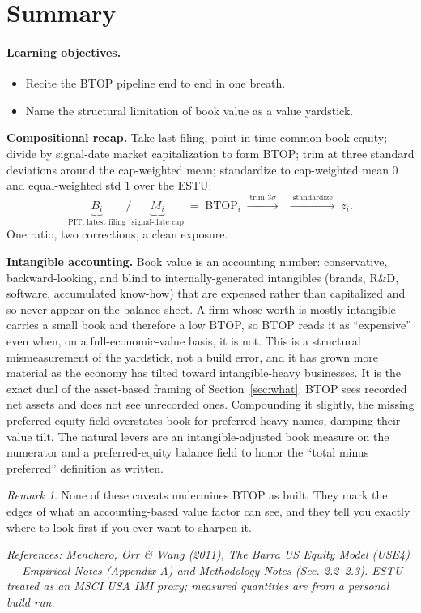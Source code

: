 \documentclass[11pt]{article}
\theoremstyle{definition}
\theoremstyle{plain}
\theoremstyle{remark}
\newtheorem*{remark}{Remark}
\begin{document}
\section{Summary}\label{sec:summary}

\paragraph{Learning objectives.}
\begin{itemize}[leftmargin=1.4em,nosep]
  \item Recite the BTOP pipeline end to end in one breath.
  \item Name the structural limitation of book value as a value yardstick.
\end{itemize}

\textbf{Compositional recap.} Take last-filing, point-in-time common book equity; divide by signal-date market capitalization to form BTOP; trim at three standard deviations around the cap-weighted mean; standardize to cap-weighted mean $0$ and equal-weighted std $1$ over the ESTU:
\[
  \underbrace{B_i}_{\text{PIT, latest filing}} \Big/ \underbrace{M_i}_{\text{signal-date cap}}
  \;=\; \mathrm{BTOP}_i
  \;\xrightarrow{\;\text{trim }3\sigma\;}\;
  \;\xrightarrow{\;\text{standardize}\;}\; z_i.
\]
One ratio, two corrections, a clean exposure.

\begin{pitfall}
\textbf{Intangible accounting.} Book value is an accounting number: conservative, backward-looking, and blind to internally-generated intangibles (brands, R\&D, software, accumulated know-how) that are expensed rather than capitalized and so never appear on the balance sheet. A firm whose worth is mostly intangible carries a small book and therefore a low BTOP, so BTOP reads it as ``expensive'' even when, on a full-economic-value basis, it is not. This is a structural mismeasurement of the yardstick, not a build error, and it has grown more material as the economy has tilted toward intangible-heavy businesses. It is the exact dual of the asset-based framing of Section~\ref{sec:what}: BTOP sees recorded net assets and does not see unrecorded ones. Compounding it slightly, the missing preferred-equity field overstates book for preferred-heavy names, damping their value tilt. The natural levers are an intangible-adjusted book measure on the numerator and a preferred-equity balance field to honor the ``total minus preferred'' definition as written.
\end{pitfall}

\begin{remark}
None of these caveats undermines BTOP as built. They mark the edges of what an accounting-based value factor can see, and they tell you exactly where to look first if you ever want to sharpen it.
\end{remark}

\begin{center}\small\itshape
References: Menchero, Orr \& Wang (2011), \textit{The Barra US Equity Model (USE4)} --- Empirical Notes (Appendix A) and Methodology Notes (Sec. 2.2--2.3). ESTU treated as an MSCI USA IMI proxy; measured quantities are from a personal build run.
\end{center}
\end{document}
